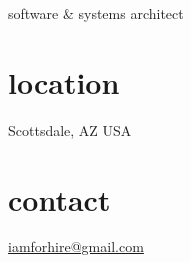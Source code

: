 \documentclass[]{cv}
\begin{document}
       {software \& systems architect}

\begin{aside}
    \section{location}
        Scottsdale, AZ
        USA
    \section{contact}
        \href{mailto:iamforhire@gmail.com}{iamforhire@gmail.com}
\end{aside}





\end{document}
